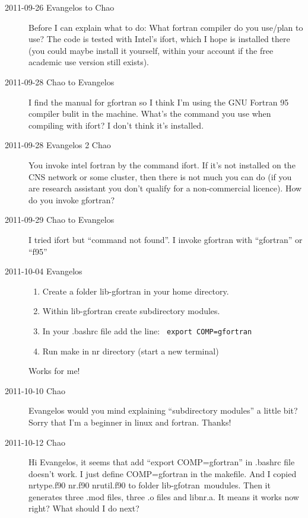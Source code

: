 \begin{description}
\item[2011-09-26 Evangelos to Chao] Before I can explain what to do:
What fortran compiler do you use/plan to use?
The code is tested with Intel's ifort, which I hope is installed there (you
could maybe install it yourself, within your account if the free academic use
version still exists).

\item[2011-09-28 Chao to Evangelos]I find the manual for gfortran so I think I'm using the GNU Fortran 95 compiler bulit in the machine. What's the command you use when compiling with ifort? I don't think it's installed.

\item[2011-09-28 Evangelos 2 Chao]You invoke intel fortran by the command ifort. If it's not installed on the CNS network or some cluster, then there is not much you can do
(if you are research assistant you don't qualify for a non-commercial licence). How do you invoke gfortran?

\item[2011-09-29 Chao to Evangelos] I tried ifort but ``command not found''. I invoke gfortran with ``gfortran'' or ``f95''

\item[2011-10-04 Evangelos]
\begin{enumerate}
 \item Create a folder lib-gfortran in your home directory.
 \item Within lib-gfortran create subdirectory modules.
 \item In your .bashrc file add the line:
  \verb| export COMP=gfortran |
 \item Run make in nr directory (start a new terminal)
\end{enumerate}
Works for me!

\item[2011-10-10 Chao]
Evangelos would you mind explaining ``subdirectory modules'' a little bit? Sorry that I'm a beginner in linux and fortran. Thanks!

\item[2011-10-12 Chao]
Hi Evangelos, it seems that add ``export COMP=gfortran'' in .bashrc file doesn't work. I just define COMP=gfortran in the makefile. And I copied nrtype.f90 nr.f90 nrutil.f90 to folder lib-gfotran\ moudules. Then it generates three .mod files, three .o files and libnr.a. It means it works now right? What should I do next?


\end{description}
